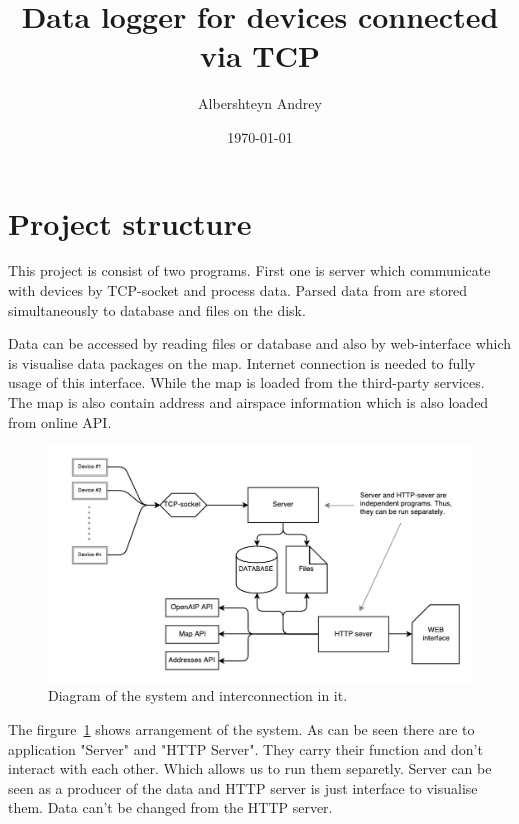 \documentclass[12pt]{article}
\title{Data logger for devices connected via TCP}
\author{Albershteyn Andrey}
\date{\today}
\begin{document}
\maketitle

\section{Project structure}
\par This project is consist of two programs. First one is server which
communicate with devices by TCP-socket and process data. Parsed data from are
stored simultaneously to database and files on the disk.
\par Data can be accessed by reading files or database and also by
web-interface which is visualise data packages on the map. Internet connection
is needed to fully usage of this interface. While the map is loaded from the
third-party services. The map is also contain address and airspace information
which is also loaded from online API.

\begin{figure}[htb!]
    \includegraphics[width=1\textwidth]{./images/system_diagram.pdf}
    \caption{Diagram of the system and interconnection in it.}
    \label{fig:system_diagram}
    \centering
\end{figure}

\par The firgure~\ref{fig:system_diagram} shows arrangement of the system. As
can be seen there are to application "Server" and "HTTP Server". They carry
their function and don't interact with each other. Which allows us to run them
separetly. Server can be seen as a producer of the data and HTTP server is just
interface to visualise them. Data can't be changed from the HTTP server.
\end{document}
